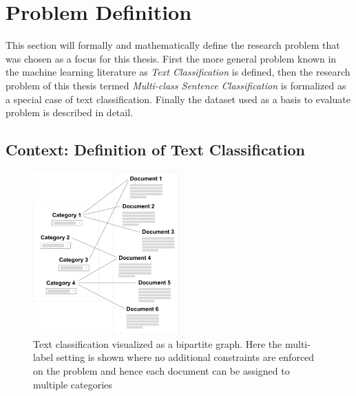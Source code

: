 
\clearpage

\section{Problem Definition}
\label{sec:Problem Definition}

This section will formally and mathematically define the research problem that was chosen as a focus for this thesis. First the more general problem known in the machine learning literature as \emph{Text Classification} is defined, then the research problem of this thesis termed \emph{Multi-class Sentence Classification} is formalized as a special case of text classification. Finally the dataset used as a basis to evaluate problem is described in detail.

\subsection{Context: Definition of Text Classification}
\label{subs:Context: Definition of Text Classification}

\begin{figure}
  \begin{center}
    \includegraphics[width=0.5\textwidth]{img/bipartite-graph-text-classification}
  \end{center}
  \caption{Text classification visualized as a bipartite graph. Here the multi-label setting is shown where no additional constraints are enforced on the problem and hence each document can be assigned to multiple categories}
\label{fig:bipartite-graph-text-classification}
\end{figure}

